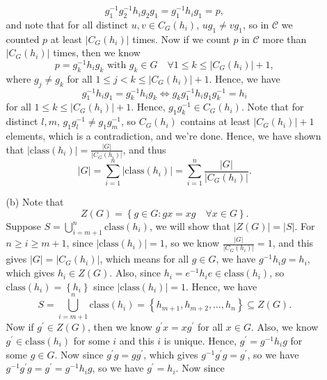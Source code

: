 \documentclass[a4paper,12pt]{article}
\begin{document}
\begin{enumerate}
\begin{itemize}
        \[
            g_1^{-1} g_2^{-1} h_i g_2 g_1 = g_1^{-1} h_i g_1 = p,
        \] and note that for all distinct \(u, v \in C_G(h_i)\), \(u g_1 \neq v g_1\), so in \(\mathcal{C} \) we counted \(p\) at least \(\left\vert C_G(h_i) \right\vert \) times. Now if we count \(p\) in \(\mathcal{C} \) more than \(\left\vert C_G(h_i) \right\vert \) times, then we know 
        \[
            p = g_k^{-1} h_i g_k \text{ with } g_k \in G \quad \forall 1 \le k \le \left\vert C_G(h_i) \right\vert + 1,
        \] where \(g_j \neq g_k\) for all \(1 \le j < k \le \left\vert C_G(h_i) \right\vert + 1\). Hence, we have 
        \[
            g_1^{-1} h_i g_1 = g_k^{-1} h_i g_k \iff g_k g_1^{-1} h_i g_1 g_k^{-1} = h_i
        \]  for all \(1 \le k \le \left\vert C_G(h_i) \right\vert + 1\). Hence, \(g_1 g_k^{-1} \in C_G(h_i)\). Note that for distinct \(l, m\), \(g_1 g_l^{-1} \neq g_1 g_m^{-1}\), so \( C_G(h_i) \) contains at least \(\left\vert C_G(h_i) \right\vert + 1 \) elements, which is a contradiction, and we're done. Hence, we have shown that \(\left\vert \mathrm{class}(h_i) \right\vert  = \frac{\vert G \vert }{\vert C_G(h_i) \vert }\), and thus 
        \[
            \vert G \vert = \sum_{i=1}^n \vert \mathrm{class}(h_i)  \vert = \sum_{i=1}^n \frac{\left\vert G \right\vert }{\left\vert C_G(h_i) \right\vert }. 
        \]  
        \item [(b)] Note that
        \[
            Z(G) = \left\{ g \in G: gx = xg \quad \forall x \in G \right\}. 
        \]
        Suppose \(S = \bigcup_{i=m+1}^n \mathrm{class}(h_i)  \), we will show that \(\vert Z(G) \vert = \vert S \vert  \). For \(n \ge i \ge m + 1\), since \(\vert \mathrm{class}(h_i)  \vert = 1\), so we know \(\frac{\vert G \vert }{\vert C_G(h_i) \vert } = 1\), and this gives \(\vert G \vert = \vert C_G(h_i) \vert  \), which means for all \(g \in G\), we have \(g^{-1} h_i g = h_i\), which gives \(h_i \in Z(G)\). Also, since \(h_i = e^{-1} h_i e \in \mathrm{class}(h_i) \), so \(\mathrm{class}(h_i) = \left\{ h_i \right\}  \) since \(\vert \mathrm{class}(h_i)  \vert = 1 \). Hence, we have 
        \[
            S = \bigcup_{i=m+1}^n \mathrm{class}(h_i) = \left\{ h_{m+1}, h_{m+2}, \dots , h_n \right\} \subseteq Z(G).    
        \]
        Now if \(g^{\prime} \in Z(G)\), then we know \(g^{\prime} x = x g^{\prime} \) for all \(x \in G\). Also, we know \(g^{\prime} \in \mathrm{class}(h_i) \) for some \(i\) and this \(i\) is unique. Hence, \(g^{\prime} = g^{-1} h_i g\) for some \(g \in G\). Now since \(g^{\prime} g = g g^{\prime}\), 
        which gives \(g^{-1} g^{\prime} g = g^{\prime} \), so we have \(g^{-1} g^{\prime} g = g^{\prime} = g^{-1} h_i g\), so we have \(g^{\prime} = h_i\). Now since

\end{itemize}
\end{enumerate}
\end{document}

